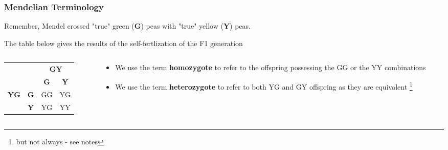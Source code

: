 \documentclass{beamer}
\newcommand\blfootnote[1]{%
	\begingroup
	\renewcommand\thefootnote{}\footnote{#1}%
	\addtocounter{footnote}{-1}%
	\endgroup
}
\begin{document}
\begin{frame}
	\frametitle{Mendelian Terminology}
	
	
	Remember, Mendel crossed "true" green (\textbf{G}) peas with "true" yellow (\textbf{Y}) peas.
	
	\bigskip
	
	The table below gives the results of the self-fertlization of the F1 generation\\
	
	\bigskip	
	\begin{columns}	
		\begin{column}{0.4\textwidth}
			
			\begin{flushright}
				\begin{tabular}{c|c|c|c|}
					\multicolumn{2}{c|}{} & \multicolumn{2}{c|}{\textbf{GY}} \\
					\multicolumn{2}{c|}{} & \textbf{G} & \textbf{Y} \\
					\hline 
					\multirow{2}{*}{\textbf{YG}}	& \textbf{G}& GG& YG \\		
					\cline{2-4} 
					&	\textbf{Y} & YG & YY \\
					\hline
				\end{tabular}
			\end{flushright}
		\end{column} 
		
		\begin{column}{0.7\textwidth}
			\begin{itemize}
			\item We use the term \textbf{homozygote} to refer to the offspring possessing the GG or the YY combinations
			\item We use the term \textbf{heterozygote} to refer to both YG and GY offspring as they are equivalent\blfootnote{but not always - see notes}
			\end{itemize}
		\end{column}
	\end{columns}
	
\end{frame}
\end{document}

